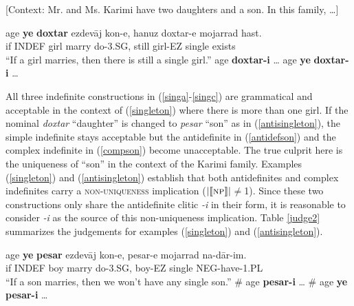 \documentclass{salt}
\begin{document}
	\begin {exe}
	\ex \label {singleton}	{\footnotesize [Context: Mr. and Ms. Karimi have two daughters and a son. In this family, \dots]}
		\begin {xlist}
		\ex \label {singa}
		\gll	age	{\color {red}\textbf{ye}} \textbf{doxtar}	ezdev\={a}j kon-e, hanuz doxtar-e mojarrad hast.\\
			if {\scriptsize INDEF}	girl	marry	do-{\scriptsize 3.SG}, still	girl-{\scriptsize EZ}	single	exists\\
			``If a girl marries, then there is still a single girl.''
		\ex \label {singb} age	\textbf{doxtar-{\color {blue}i}}	\dots
		\ex \label{singc} age	\textbf{{\color {red}ye}}	\textbf{doxtar-{\color {blue}i}}	\dots
		\end {xlist}
	\end {exe}

All three indefinite constructions in (\ref{singa}-\ref{singc}) are grammatical and acceptable in the context of (\ref{singleton}) where there is more than one girl. If the nominal \emph{doxtar} ``daughter'' is changed to \emph{pesar} ``son'' as in (\ref{antisingleton}), the simple indefinite stays acceptable but the antidefinite in (\ref{antidefson}) and the complex indefinite in (\ref{compson}) become unacceptable. The true culprit here is the uniqueness of ``son'' in the context of the Karimi family. Examples (\ref{singleton}) and (\ref{antisingleton}) establish that both antidefinites and complex indefinites carry a \textsc{non-uniqueness} implication ($| \llbracket \textsc{np} \rrbracket |$$\not=$1). Since these two constructions only share the antidefinite clitic \emph{-i} in their form, it is reasonable to consider \emph{-i} as the source of this non-uniqueness implication. Table \ref{judge2} summarizes the judgements for examples (\ref{singleton}) and (\ref{antisingleton}).

	\begin {exe}
	\ex \label {antisingleton}
		\begin {xlist}
		\ex \label {stanone} 
		\gll	age	{\color {red}\textbf{ye}} \textbf{pesar}	ezdev\={a}j kon-e, pesar-e mojarrad na-d\={a}r-im.\\
			if {\scriptsize INDEF}	boy	marry	do-{\scriptsize 3.SG}, boy-{\scriptsize EZ}	single	{\scriptsize NEG}-have-{\scriptsize1.PL}\\
			``If a son marries, then we won't have any single son.''
		\ex \label {antidefson} 
			\#	age	\textbf{pesar-{\color {blue}i}}	\dots
		\ex \label {compson} 
			\#	age	\textbf{{\color {red}ye}	pesar-{\color {blue}i}}	\dots
	\end {xlist}

	\end {exe}
\end{document}
